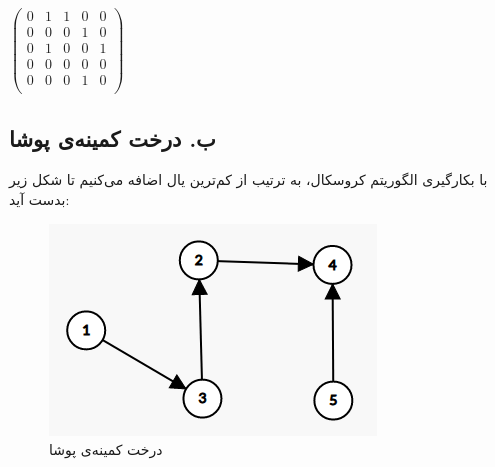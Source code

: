 \documentclass{article}
\begin{document}
\begin{multicols}{2}
$\begin{pmatrix}
    0&1&1&0&0\\
    0&0&0&1&0\\
    0&1&0&0&1\\
    0&0&0&0&0\\
    0&0&0&1&0\\
\end{pmatrix}$

\subsection*{ب. درخت کمینه‌ی پوشا}
با بکارگیری الگوریتم کروسکال، به ترتیب از کم‌ترین یال اضافه می‌کنیم تا شکل زیر بدست آید:
\begin{figure}[H]
    \center
    \includegraphics[width=0.8\linewidth]{Photos/HW1/mst.png}
    \caption{درخت کمینه‌ی پوشا}
    \label{fig:my_label}
\end{figure}

\end{multicols}
\end{document}
